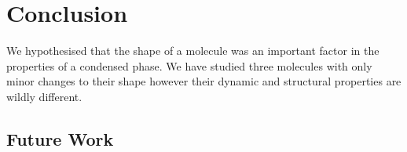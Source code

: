 \chapter{Conclusion}

We hypothesised that the shape of a molecule was an important factor in the properties of a condensed phase. We have studied three molecules with only minor changes to their shape however their dynamic and structural properties are wildly different. 

\section{Future Work}
